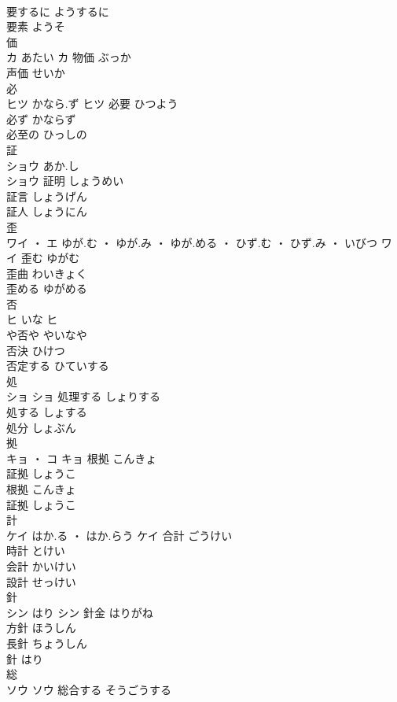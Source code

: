 \documentclass[8pt]{extreport}
\begin{document}
\begin{CJK}{UTF8}{min}
\\	要するに	ようするに	
\\	要素	ようそ	
\\	価	
\\	カ	あたい	カ	物価	ぶっか	
\\	声価	せいか	
\\	必	
\\	ヒツ	かなら.ず	ヒツ	必要	ひつよう	
\\	必ず	かならず	
\\	必至の	ひっしの	
\\	証	
\\	ショウ	あか.し
\\	ショウ	証明	しょうめい	
\\	証言	しょうげん	
\\	証人	しょうにん	
\\	歪	
\\	ワイ ・ エ	ゆが.む ・ ゆが.み ・ ゆが.める ・ ひず.む ・ ひず.み ・ いびつ	ワイ	歪む	ゆがむ	
\\	歪曲	わいきょく	
\\	歪める	ゆがめる	
\\	否	
\\	ヒ	いな	ヒ	
\\	や否や	やいなや	
\\	否決	ひけつ	
\\	否定する	ひていする	
\\	処	
\\	ショ		ショ	処理する	しょりする	
\\	処する	しょする	
\\	処分	しょぶん	
\\	拠	
\\	キョ ・ コ		キョ	根拠	こんきょ	
\\	証拠	しょうこ	
\\	根拠	こんきょ	
\\	証拠	しょうこ	
\\	計	
\\	ケイ	はか.る ・ はか.らう	ケイ	合計	ごうけい	
\\	時計	とけい	
\\	会計	かいけい	
\\	設計	せっけい	
\\	針	
\\	シン	はり	シン	針金	はりがね	
\\	方針	ほうしん	
\\	長針	ちょうしん	
\\	針	はり	
\\	総	
\\	ソウ		ソウ	総合する	そうごうする	

\end{CJK}
\end{document}
